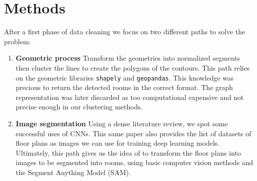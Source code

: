 \documentclass[11pt]{article}
\begin{document}
\section{Methods}
\label{sec:methods}

After a first phase of data cleaning we focus on two different paths to solve the problem:

\begin{enumerate}
    \item \textbf{Geometric process} Transform the geometries into normalized segments 
    \cite{Schafer2011AutomaticGO} then cluster the lines to 
    create the polygons\cite{dominguez2012Semiautomaticdetection} of the contours. This path relies on the
    geometric libraries \texttt{shapely} and \texttt{geopandas}. This knowledge
    was precious to return the detected rooms in the correct format. The graph representation 
    was later discarded as too computational expensive and not precise enough in our clustering methods.
    \item \textbf{Image segmentation} Using a dense literature review\cite{PIZARRO2022104348}, we 
    spot some successful uses of CNNs\cite{ijgi10020097}. This same paper also provides the list
    of datasets of floor plans as images we can use for training deep learning models.
    Ultimately, this path gives us the idea of to transform the floor plans into
    images to be segmented into rooms, using basic computer vision methods and the Segment 
    Anything Model (SAM)\cite{kirillov2023segment}.
\end{enumerate}
\end{document}

